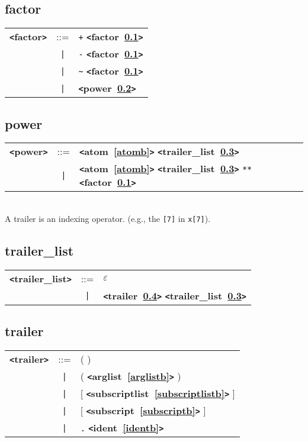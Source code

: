 \documentclass[12pt]{article}
\begin{document}
\subsection{factor}
\label{factorb}
\begin{tabular}{lcl}
{\bf \verb+<+factor\verb+>+} & ::=  & \verb|+| {\bf \verb+<+factor~\ref{factorb}\verb+>+}  \\
 & \verb+|+  & \verb|-| {\bf \verb+<+factor~\ref{factorb}\verb+>+}  \\
 & \verb+|+  & \verb|~| {\bf \verb+<+factor~\ref{factorb}\verb+>+}  \\
 & \verb+|+  & {\bf \verb+<+power~\ref{powerb}\verb+>+}  \\
\end{tabular}

\subsection{power}
\label{powerb}
\begin{tabular}{lcl}
{\bf \verb+<+power\verb+>+} & ::=  & {\bf \verb+<+atom~\ref{atomb}\verb+>+}  {\bf \verb+<+trailer\_list~\ref{trailerzzzlistb}\verb+>+}  \\
 & \verb+|+  & {\bf \verb+<+atom~\ref{atomb}\verb+>+}  {\bf \verb+<+trailer\_list~\ref{trailerzzzlistb}\verb+>+}  \verb|**| {\bf \verb+<+factor~\ref{factorb}\verb+>+}  \\
\end{tabular} \\

A trailer is an indexing operator.  (e.g., the \verb|[7]| in \verb|x[7]|).

\subsection{trailer\_list}
\label{trailerzzzlistb}
\begin{tabular}{lcl}
{\bf \verb+<+trailer\_list\verb+>+} & ::=  & $\varepsilon$ \\
 & \verb+|+  & {\bf \verb+<+trailer~\ref{trailerb}\verb+>+}  {\bf \verb+<+trailer\_list~\ref{trailerzzzlistb}\verb+>+}  \\
\end{tabular}

\subsection{trailer}
\label{trailerb}
\begin{tabular}{lcl}
{\bf \verb+<+trailer\verb+>+} & ::=  & ( ) \\
 & \verb+|+  & ( {\bf \verb+<+arglist~\ref{arglistb}\verb+>+}  ) \\
 & \verb+|+  & [ {\bf \verb+<+subscriptlist~\ref{subscriptlistb}\verb+>+}  ] \\
 & \verb+|+  & [ {\bf \verb+<+subscript~\ref{subscriptb}\verb+>+}  ] \\
 & \verb+|+  & \verb|.| {\bf \verb+<+ident~\ref{identb}\verb+>+}  \\
\end{tabular}
\end{document}
